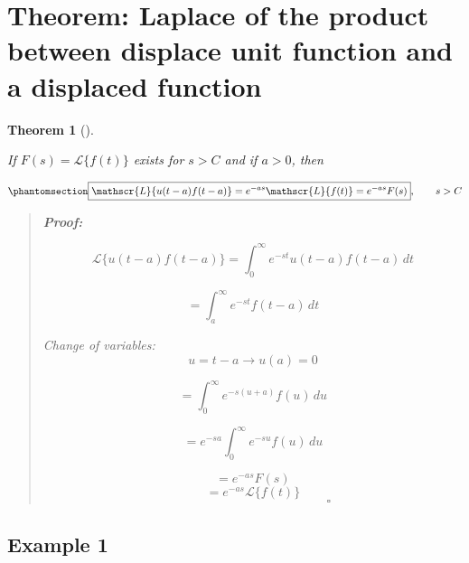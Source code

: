\documentclass[
  letterpaper,
  DIV=11,
  numbers=noendperiod]{scrreprt}
\theoremstyle{plain}
\newtheorem{theorem}{Theorem}[chapter]
\theoremstyle{remark}
\begin{document}
\section{Theorem: Laplace of the product between displace unit function
and a displaced
function}\label{theorem-laplace-of-the-product-between-displace-unit-function-and-a-displaced-function}

\begin{tcolorbox}[enhanced jigsaw, title=\textcolor{quarto-callout-note-color}{\faInfo}\hspace{0.5em}{Theorem}, colbacktitle=quarto-callout-note-color!10!white, opacitybacktitle=0.6, opacityback=0, rightrule=.15mm, breakable, titlerule=0mm, colback=white, bottomtitle=1mm, colframe=quarto-callout-note-color-frame, toprule=.15mm, leftrule=.75mm, toptitle=1mm, arc=.35mm, bottomrule=.15mm, left=2mm, coltitle=black]

\begin{theorem}[]\protect\hypertarget{thm-Lpp}{}\label{thm-Lpp}

If \(F(s)=\mathscr{L}\{f(t)\}\) exists for \(s>C\) and if \(a>0\), then

\begin{equation}\phantomsection\label{eq-utf}{\boxed{\mathscr{L}\{u(t-a)f(t-a)\}=e^{-as}\mathscr{L}\{f(t)\}=e^{-as}F(s)},\qquad s>C}\end{equation}

\begin{quote}
\textbf{Proof:}

\[\mathscr{L}\{u(t-a)f(t-a)\}=\int_0^\infty e^{-st} u(t-a)f(t-a)\,dt\]

\[=\int_a^\infty e^{-st} f(t-a)\,dt\]

Change of variables: \[u=t-a\rightarrow u(a)=0\]

\[=\int_0^\infty e^{-s(u+a)} f(u)\,du\]

\[=e^{-sa}\int_0^\infty e^{-su} f(u)\,du\]

\[=e^{-as}F(s)\] \[=e^{-as}\mathscr{L}\{f(t)\}\] \[\hspace{2in}\square\]
\end{quote}

\end{theorem}

\end{tcolorbox}

\subsection{Example 1}\label{example-1-2}
\end{document}
